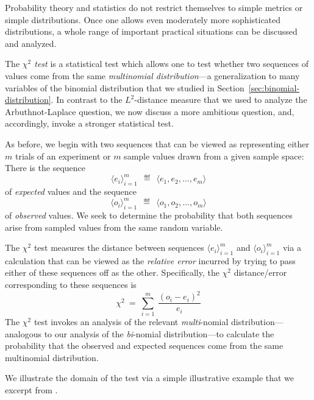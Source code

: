 Probability theory and statistics do not restrict themselves to simple metrics or simple distributions.  Once one allows even moderately more sophisticated distributions, a whole range of important practical situations can be discussed and analyzed.

\medskip

The {\it $\chi^2$ test} is a statistical test which allows one to test whether two sequences of values come from the same {\em multinomial distribution}---a generalization to many variables of the binomial distribution that we studied in Section~\ref{sec:binomial-distribution}.  In contrast to the $L^2$-distance measure that we used to analyze the Arbuthnot-Laplace question, we now discuss a more ambitious question, and, accordingly, invoke a stronger statistical test.

\smallskip

As before, we begin with two sequences that can be viewed as representing either $m$ trials of an experiment or $m$ sample values drawn from a given sample space:  There is the sequence 
\[ \langle e_i \rangle_{i=1}^m \ \ \eqdef \ \ \langle e_1, e_2, \ldots, e_m \rangle \]
of {\em expected} values and the  sequence
\[ \langle o_i \rangle_{i=1}^m \ \ \eqdef \ \ \langle o_1, o_2, \ldots, o_m \rangle \]
of {\em observed} values.  We seek to determine the probability that both sequences arise from sampled values from the same random variable.

\smallskip

The $\chi^2$ test measures the distance between sequences $\langle e_i \rangle_{i=1}^m$ and $\langle o_i \rangle_{i=1}^m$ via a calculation that can be viewed as the {\em relative error} incurred by trying to pass either of these sequences off as the other.  Specifically, the $\chi^2$ distance/error corresponding to these sequences is
\[ \chi^2 \ = \ \sum_{i=1}^m \ \frac{(o_i- e_i)^2}{e_i} \]
The $\chi^2$ test invokes an analysis of the relevant {\em multi}-nomial distribution---analogous to our analysis of the {\em bi}-nomial distribution---to calculate the probability that the observed and expected sequences come from the same multinomial distribution.

\medskip

We illustrate the domain of the test via a simple illustrative example that we excerpt from \cite{Hoel58}.

\bigskip


